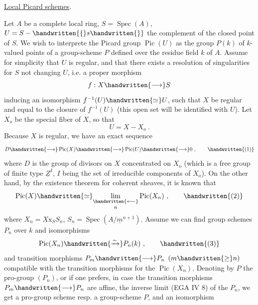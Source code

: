 \uline{Local Picard schemes}.

Let $A$ be a complete local ring,  $S=\operatorname{Spec}(A)$, $U=S-\handwritten{\{}s\handwritten{\}}$ the complement of the closed point of $S$. We wish to interprete the Picard  group $\operatorname{Pic}(U)$ as  the group $P(k)$ of $k$-valued points of a group-scheme $P$ defined over the residue field $k$ of $A$. Assume for simplicity that $U$ is regular, and that there exists a resolution of singularities for $S$ not changing $U$, i.e. a proper morphism
\[
f:X\handwritten{\longrightarrow}S
\]
inducing an isomorphism $f^{-1}(U)\handwritten{\simeq}U$, such that $X$ be regular and equal to the closure of $f^{-1}(U)$ (this open set will be identified with $U$). Let $X_o$ be the special fiber of $X$, so that
\[
U=X-X_o\ .
\]
Because $X$ is regular, we have an exact sequence
\[
D\handwritten{\longrightarrow}\operatorname{Pic}(X)\handwritten{\longrightarrow}\operatorname{Pic}(U)\handwritten{\longrightarrow}0\ ,
\tag*{\handwritten{(1)}}
\]
where $D$ is the group of divisors on $X$ concentrated on $X_o$ (which is a free group of finite type $\underline{Z}^{I}$, $I$ being the set of irreducible components of $X_o$). On the other hand, by the existence theorem for coherent sheaves, it is known that
\[
\operatorname{Pic}(X)\handwritten{\simeq}\underset{n}{\underset{\handwritten{\longleftarrow}}{\lim}}\operatorname{Pic}(X_n)\ ,
\tag*{\handwritten{(2)}}
\]
where $X_n=X\mathrm{x}_S S_n$, $S_n=\operatorname{Spec}(A/\underline{m}^{n+1})$. Assume we can find group schemes $P_n$ over $k$ and isomorphisms
\[
\operatorname{Pic}(X_n)\handwritten{\xrightarrow{\sim}}P_n(k)\ ,
\tag*{\handwritten{(3)}}
\]
and transition morphisms $P_m\handwritten{\longrightarrow}P_n$ $(m\handwritten{\geq}n)$ compatible with the transition morphisms for the $\operatorname{Pic}(X_n)$. Denoting by $P$ the pro-group $(P_n)$, or if one prefers, in case the transition morphisms $P_m\handwritten{\longrightarrow}P_n$ are affine, the inverse limit (EGA IV 8) of the $P_n$, we get a pro-group scheme resp. a group-scheme $P$, and an isomorphism
